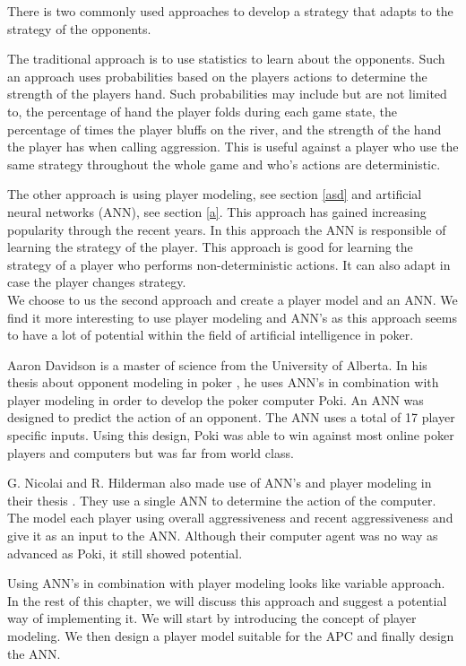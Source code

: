 There is two commonly used approaches to develop a strategy that adapts to the strategy of the opponents.

The traditional approach is to use statistics to learn about the opponents. Such an approach uses probabilities based on the players actions to determine the strength of the players hand. Such probabilities may include but are not limited to, the percentage of hand the player folds during each game state, the percentage of times the player bluffs on the river, and the strength of the hand the player has when calling aggression. This is useful against a player who use the same strategy throughout the whole game and who's actions are deterministic.

The other approach is using player modeling, see section \ref{asd} and artificial neural networks (ANN), see section \ref{a}. This approach has gained increasing popularity through the recent years. In this approach the ANN is responsible of learning the strategy of the player. This approach is good for learning the strategy of a player who performs non-deterministic actions. It can also adapt in case the player changes strategy.\\

We choose to us the second approach and create a player model and an ANN. We find it more interesting to use player modeling and ANN's as this approach seems to have a lot of potential within the field of artificial intelligence in poker.

Aaron Davidson is a master of science from the University of Alberta. In his thesis about opponent modeling in poker \cite{opp-mod}, he uses ANN's in combination with player modeling in order to develop the poker computer Poki. An ANN was designed to predict the action of an opponent. The ANN uses a total of 17 player specific inputs. Using this design, Poki was able to win against most online poker players and computers but was far from world class.

G. Nicolai and R. Hilderman also made use of ANN's and player modeling in their thesis \cite{poker-agents}. They use a single ANN to determine the action of the computer. The model each player using overall aggressiveness and recent aggressiveness and give it as an input to the ANN. Although their computer agent was no way as advanced as Poki, it still showed potential.

Using ANN's in combination with player modeling looks like variable approach. In the rest of this chapter, we will discuss this approach and suggest a potential way of implementing it. We will start by introducing the concept of player modeling. We then design a player model suitable for the APC and finally design the ANN.

